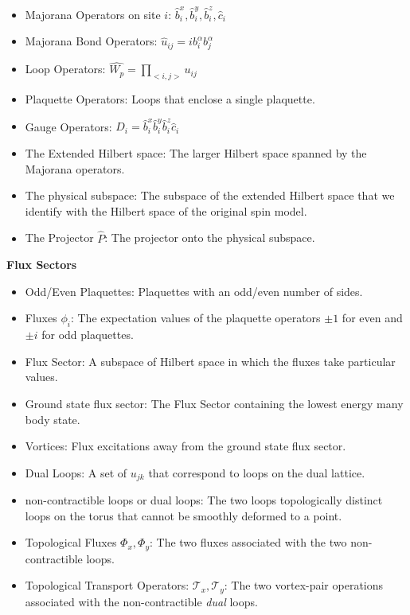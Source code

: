 \begin{itemize}
\tightlist
\item
  Majorana Operators on site \(i\): \(\hat{b}^x_i, \hat{b}^y_i, \hat{b}^z_i, \hat{c}_i\)
\item
  Majorana Bond Operators: \(\hat{u}_{ij} = i b_i^\alpha b_j^\alpha\)
\item
  Loop Operators: \(\hat{W_p} = \prod_{<i,j>} u_{ij}\)
\item
  Plaquette Operators: Loops that enclose a single plaquette.
\item
  Gauge Operators: \(D_i = \hat{b}^x_i \hat{b}^y_i \hat{b}^z_i \hat{c}_i\)
\item
  The Extended Hilbert space: The larger Hilbert space spanned by the Majorana operators.
\item
  The physical subspace: The subspace of the extended Hilbert space that we identify with the Hilbert space of the original spin model.
\item
  The Projector \(\hat{P}\): The projector onto the physical subspace.
\end{itemize}

\textbf{Flux Sectors}

\begin{itemize}
\item
  Odd/Even Plaquettes: Plaquettes with an odd/even number of sides.
\item
  Fluxes \(\phi_i\): The expectation values of the plaquette operators \(\pm 1\) for even and \(\pm i\) for odd plaquettes.
\item
  Flux Sector: A subspace of Hilbert space in which the fluxes take particular values.
\item
  Ground state flux sector: The Flux Sector containing the lowest energy many body state.
\item
  Vortices: Flux excitations away from the ground state flux sector.
\item
  Dual Loops: A set of \(u_{jk}\) that correspond to loops on the dual lattice.
\item
  non-contractible loops or dual loops: The two loops topologically distinct loops on the torus that cannot be smoothly deformed to a point.
\item
  Topological Fluxes \(\Phi_{x}, \Phi_{y}\): The two fluxes associated with the two non-contractible loops.
\item
  Topological Transport Operators: \(\mathcal{T}_{x}, \mathcal{T}_{y}\): The two vortex-pair operations associated with the non-contractible \emph{dual} loops.
\end{itemize}

